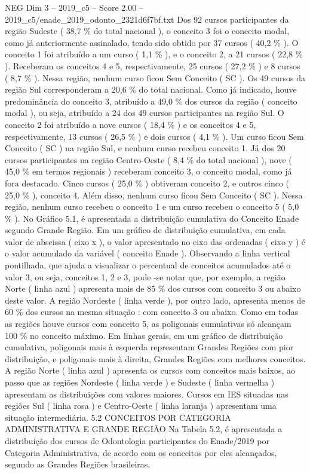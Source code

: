 \begin{textsample}{NEG Dim 3 – 2019\_c5 – Score 2.00 – 2019\_c5/enade\_2019\_odonto\_2321d6f7bf.txt}
Dos 92 cursos participantes da região Sudeste ( 38,7 \% do total nacional ), o conceito 3 foi o conceito modal, como já anteriormente assinalado, tendo sido obtido por 37 cursos ( 40,2 \% ).
O conceito 1 foi atribuído a um curso ( 1,1 \% ), e o conceito 2, a 21 cursos ( 22,8 \% ).
Receberam os conceitos 4 e 5, respectivamente, 25 cursos ( 27,2 \% ) e 8 cursos ( 8,7 \% ).
Nessa região, nenhum curso ficou Sem Conceito ( SC ).
Os 49 cursos da região Sul corresponderam a 20,6 \% do total nacional.
Como já indicado, houve predominância do conceito 3, atribuído a 49,0 \% dos cursos da região ( conceito modal ), ou seja, atribuído a 24 dos 49 cursos participantes na região Sul.
O conceito 2 foi atribuído a nove cursos ( 18,4 \% ) e os conceitos 4 e 5, respectivamente, 13 cursos ( 26,5 \% ) e dois cursos ( 4,1 \% ).
Um curso ficou Sem Conceito ( SC ) na região Sul, e nenhum curso recebeu conceito 1.
Já dos 20 cursos participantes na região Centro-Oeste ( 8,4 \% do total nacional ), nove ( 45,0 \% em termos regionais ) receberam conceito 3, o conceito modal, como já fora destacado.
Cinco cursos ( 25,0 \% ) obtiveram conceito 2, e outros cinco ( 25,0 \% ), conceito 4.
Além disso, nenhum curso ficou Sem Conceito ( SC ).
Nessa região, nenhum curso recebeu o conceito 1 e um curso recebeu o conceito 5 ( 5,0 \% ).
No Gráfico 5.1, é apresentada a distribuição cumulativa do Conceito Enade segundo Grande Região.
Em um gráfico de distribuição cumulativa, em cada valor de abscissa ( eixo x ), o valor apresentado no eixo das ordenadas ( eixo y ) é o valor acumulado da variável ( conceito Enade ).
Observando a linha vertical pontilhada, que ajuda a visualizar o percentual de conceitos acumulados até o valor 3, ou seja, conceitos 1, 2 e 3, pode -se notar que, por exemplo, a região Norte ( linha azul ) apresenta mais de 85 \% dos cursos com conceito 3 ou abaixo deste valor.
A região Nordeste ( linha verde ), por outro lado, apresenta menos de 60 \% dos cursos na mesma situação : com conceito 3 ou abaixo.
Como em todas as regiões houve cursos com conceito 5, as poligonais cumulativas só alcançam 100 \% no conceito máximo.
Em linhas gerais, em um gráfico de distribuição cumulativa, poligonais mais à esquerda representam Grandes Regiões com pior distribuição, e poligonais mais à direita, Grandes Regiões com melhores conceitos.
A região Norte ( linha azul ) apresenta os cursos com conceitos mais baixos, ao passo que as regiões Nordeste ( linha verde ) e Sudeste ( linha vermelha ) apresentam as distribuições com valores maiores.
Cursos em IES situadas nas regiões Sul ( linha rosa ) e Centro-Oeste ( linha laranja ) apresentam uma situação intermediária. 5.2 CONCEITOS POR CATEGORIA ADMINISTRATIVA E GRANDE REGIÃO Na Tabela 5.2, é apresentada a distribuição dos cursos de Odontologia participantes do Enade/2019 por Categoria Administrativa, de acordo com os conceitos por eles alcançados, segundo as Grandes Regiões brasileiras.

\end{textsample}
